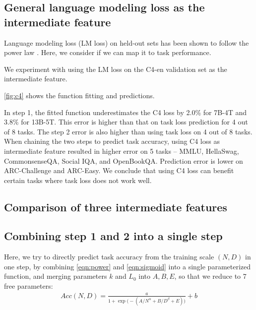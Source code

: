 \subsection{General language modeling loss as the intermediate feature}
\label{app:c4}

Language modeling loss (LM loss) on held-out sets has been shown to follow the power law \citep{Hoffmann2022TrainingCL}.
Here, we consider if we can map it to task performance.

We experiment with using the LM loss on the C4-en validation set \citep{Raffel2019ExploringTL} as the intermediate feature.



\autoref{fig:c4} shows the function fitting and predictions.

In step 1, the fitted function underestimates the C4 loss by 2.0\% for 7B-4T and 3.8\% for 13B-5T.
This error is higher than that on task loss prediction for 4 out of 8 tasks.
The step 2 error is also higher than using task loss on 4 out of 8 tasks.
When chaining the two steps to predict task accuracy, using C4 loss as intermediate feature resulted in higher error on 5 tasks -- MMLU, HellaSwag, CommonsenseQA, Social IQA, and OpenBookQA.
Prediction error is lower on ARC-Challenge and ARC-Easy.
We conclude that using C4 loss can benefit certain tasks where task loss does not work well. %

\subsection{Comparison of three intermediate features}



\subsection{Combining step 1 and 2 into a single step}
\label{app:single_step}

Here, we try to directly predict task accuracy from the training scale $(N, D)$ in one step, by combining \autoref{eqn:power} and \autoref{eqn:sigmoid} into a single parameterized function, and merging parameters $k$ and $L_0$ into $A, B, E$, so that we reduce to 7 free parameters:
\begin{align}
Acc(N, D) = \frac{a}{1 + \exp \big( -(A / N^\alpha + B / D^\beta + E) \big)} + b
\label{eqn:single_step}
\end{align}

